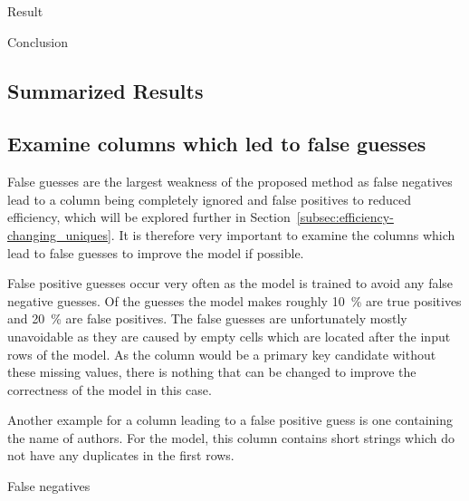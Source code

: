 Result

Conclusion




\subsection{Summarized Results}\label{subsec:correctness_conclusions} %


\subsection{Examine columns which led to false guesses}\label{subsec:correctness_examine-false-guesses} %
False guesses are the largest weakness of the proposed method as false negatives lead to a column being completely ignored and false positives to reduced efficiency, which will be explored further in Section~\ref{subsec:efficiency-changing_uniques}. It is therefore very important to examine the columns which lead to false guesses to improve the model if possible.

False positive guesses occur very often as the model is trained to avoid any false negative guesses. Of the guesses the model makes roughly \SI{10}{\percent} are true positives and \SI{20}{\percent} are false positives. %
The false guesses are unfortunately mostly unavoidable as they are caused by empty cells which are located after the input rows of the model. As the column would be a primary key candidate without these missing values, there is nothing that can be changed to improve the correctness of the model in this case.

Another example for a column leading to a false positive guess is one containing the name of authors. For the model, this column contains short strings which do not have any duplicates in the first rows. %

False negatives

